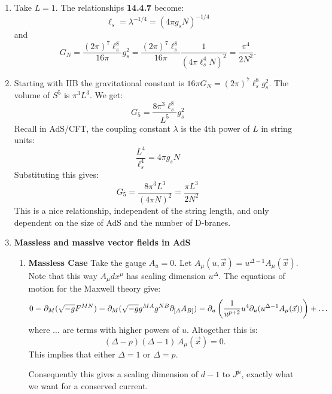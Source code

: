 \documentclass[11pt, class=article, crop=false]{standalone}
\begin{document}
\begin{enumerate}
	\item Take $L = 1$. The relationships \textbf{14.4.7} become:
	\[
		\ell_s = \lambda^{-1/4} = (4 \pi g_s N)^{-1/4}
	\]
	and
	\[
		G_N = \frac{(2 \pi)^7 \ell_s^8}{16 \pi} g_s^2 = \frac{(2 \pi)^7 \ell_s^8}{16 \pi} \frac{1}{(4 \pi \ell_s^4 N)^2} = \frac{\pi^4}{2 N^2}.
	\]
	
	\item 
	 Starting with IIB the gravitational constant is $16 \pi G_N = (2\pi)^7 \ell_s^8 g_s^2$. The volume of $S^5$ is $\pi^3 L^3$. We get:
	 \[
	 	G_5 = \frac{8 \pi^3 \ell_s^8}{L^5} g_s^2
	 \]
	 Recall in AdS/CFT, the coupling constant $\lambda$ is the 4th power of $L$ in string units: 
	 	\[
	 		\frac{L^4}{\ell_s^4} = 4 \pi g_s N
	 	\]
		Substituting this gives:
		\[
			G_5 = \frac{8 \pi^3 L^3}{(4 \pi N)^2} = \frac{\pi L^3}{2 N^2}
		\]
		This is a nice relationship, independent of the string length, and only dependent on the size of AdS and the number of D-branes. 
	
	\item \textbf{Massless and massive vector fields in AdS}
	\begin{enumerate}
		\item \textbf{Massless Case} Take the gauge $A_u = 0$. Let $A_\mu (u, \vec x) = u^{\Delta - 1} A_\mu (\vec x)$. Note that this way $A_\mu dx^\mu$ has scaling dimension $u^\Delta$. The equations of motion for the Maxwell theory give:
		\[
			0 = \partial_M (\sqrt{-g} F^{MN}) = \partial_M (\sqrt{-g} g^{M A} g^{N B} \partial_{\small[ A} A_{B\small]}) = \partial_{u} \left( \frac{1}{u^{p+2}} u^{4} \partial_{u} (u^{\Delta-1} A_\mu(\vec x)) \right) + \dots
		\]
		 where $\dots$ are terms with higher powers of $u$. Altogether this is:
		 \[
		 	(\Delta - p)(\Delta - 1)\, A_\mu (\vec x) = 0.
		 \]
		 This implies that either $\Delta = 1$ or $\Delta = p$.
		 
		
		Consequently this gives a scaling dimension of $d-1$ to $J^\mu$, exactly what we want for a conserved current. 
		

\end{enumerate}
\end{enumerate}
\end{document}
